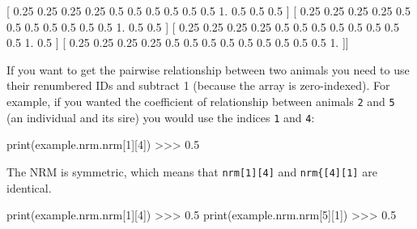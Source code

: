 \documentclass[
  letterpaper,
  DIV=11,
  numbers=noendperiod]{scrreprt}
\newenvironment{Shaded}{\begin{snugshade}}{\end{snugshade}}
\newcommand{\BuiltInTok}[1]{\textcolor[rgb]{0.00,0.23,0.31}{#1}}
\newcommand{\DecValTok}[1]{\textcolor[rgb]{0.68,0.00,0.00}{#1}}
\newcommand{\FloatTok}[1]{\textcolor[rgb]{0.68,0.00,0.00}{#1}}
\newcommand{\NormalTok}[1]{\textcolor[rgb]{0.00,0.23,0.31}{#1}}
\newcommand{\OperatorTok}[1]{\textcolor[rgb]{0.37,0.37,0.37}{#1}}
\begin{document}
\begin{Shaded}
\begin{Highlighting}[]
\NormalTok{ [ }\FloatTok{0.25} \FloatTok{0.25} \FloatTok{0.25} \FloatTok{0.25} \FloatTok{0.5}  \FloatTok{0.5}  \FloatTok{0.5}  \FloatTok{0.5}  \FloatTok{0.5}  \FloatTok{0.5}  \FloatTok{1.}   \FloatTok{0.5}  \FloatTok{0.5}  \FloatTok{0.5}\NormalTok{ ]}
\NormalTok{ [ }\FloatTok{0.25} \FloatTok{0.25} \FloatTok{0.25} \FloatTok{0.25} \FloatTok{0.5}  \FloatTok{0.5}  \FloatTok{0.5}  \FloatTok{0.5}  \FloatTok{0.5}  \FloatTok{0.5}  \FloatTok{0.5}  \FloatTok{1.}   \FloatTok{0.5}  \FloatTok{0.5}\NormalTok{ ]}
\NormalTok{ [ }\FloatTok{0.25} \FloatTok{0.25} \FloatTok{0.25} \FloatTok{0.25} \FloatTok{0.5}  \FloatTok{0.5}  \FloatTok{0.5}  \FloatTok{0.5}  \FloatTok{0.5}  \FloatTok{0.5}  \FloatTok{0.5}  \FloatTok{0.5}  \FloatTok{1.}   \FloatTok{0.5}\NormalTok{ ]}
\NormalTok{ [ }\FloatTok{0.25} \FloatTok{0.25} \FloatTok{0.25} \FloatTok{0.25} \FloatTok{0.5}  \FloatTok{0.5}  \FloatTok{0.5}  \FloatTok{0.5}  \FloatTok{0.5}  \FloatTok{0.5}  \FloatTok{0.5}  \FloatTok{0.5}  \FloatTok{0.5}  \FloatTok{1.}\NormalTok{  ]]}
\end{Highlighting}
\end{Shaded}

If you want to get the pairwise relationship between two animals you
need to use their renumbered IDs and subtract 1 (because the array is
zero-indexed). For example, if you wanted the coefficient of
relationship between animals \texttt{2} and \texttt{5} (an individual
and its sire) you would use the indices \texttt{1} and \texttt{4}:

\begin{Shaded}
\begin{Highlighting}[]
\BuiltInTok{print}\NormalTok{(example.nrm.nrm[}\DecValTok{1}\NormalTok{][}\DecValTok{4}\NormalTok{])}
\OperatorTok{\textgreater{}\textgreater{}\textgreater{}} \FloatTok{0.5}
\end{Highlighting}
\end{Shaded}

The NRM is symmetric, which means that \texttt{nrm{[}1{]}{[}4{]}} and
\texttt{nrm\{{[}4{]}{[}1{]}} are identical.

\begin{Shaded}
\begin{Highlighting}[]
\BuiltInTok{print}\NormalTok{(example.nrm.nrm[}\DecValTok{1}\NormalTok{][}\DecValTok{4}\NormalTok{])}
\OperatorTok{\textgreater{}\textgreater{}\textgreater{}} \FloatTok{0.5}
\BuiltInTok{print}\NormalTok{(example.nrm.nrm[}\DecValTok{5}\NormalTok{][}\DecValTok{1}\NormalTok{])}
\OperatorTok{\textgreater{}\textgreater{}\textgreater{}} \FloatTok{0.5}
\end{Highlighting}
\end{Shaded}
\end{document}
